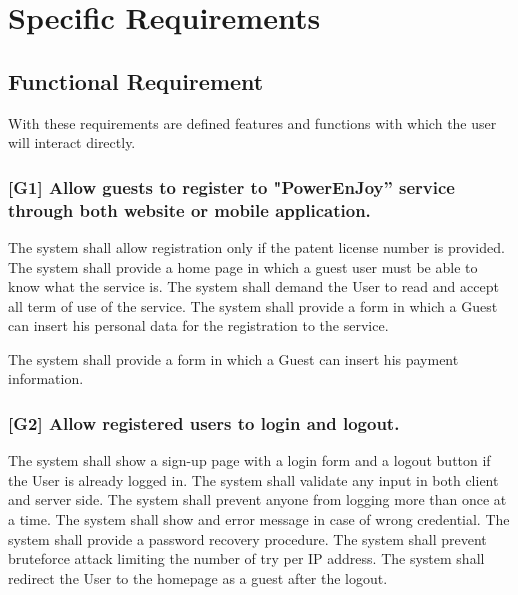 
\section{Specific Requirements}


\subsection{Functional Requirement}

With these requirements are defined features and functions with which
the user will interact directly.



\subsubsection{{[}G1{]} Allow guests to register to "PowerEnJoy'' service through both website or mobile application.}
\begin{itemize}
	\reqcounter The system shall allow registration only if the patent license number is provided.
	\reqcounter The system shall provide a home page in which a guest user must be
	able to know what the service is. 
	\reqcounter The system shall demand the User to read and accept all term of use of the service.
	\reqcounter The system shall provide a form in which a Guest can insert his personal data for the registration to the service.
	
	\reqcounter The system shall provide a form in which a Guest can insert his payment information.
	
	
\end{itemize}

\subsubsection{{[}G2{]} Allow registered users to login and logout.}
\begin{itemize}
	\reqcounter The system shall show a sign-up page with a login form and a logout button if the User is already logged in.
	\reqcounter The system shall validate any input in both client and server side.
	\reqcounter The system shall prevent anyone from logging more than once at a time.
	\reqcounter The system shall show and error message in case of wrong credential.
	\reqcounter The system shall provide a password recovery procedure.
	\reqcounter The system shall prevent bruteforce attack limiting the number of try per IP address.
	\reqcounter The system shall redirect the User to the homepage as a guest after the logout.
\end{itemize}



